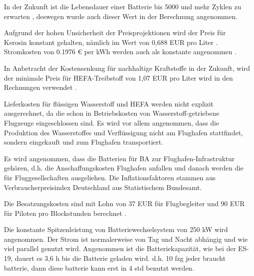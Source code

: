 In der Zukunft ist die Lebensdauer einer Batterie bis 5000 und mehr Zyklen zu erwarten \cite{reimers2018introduction}, deswegen wurde auch dieser
Wert in der Berechnung angenommen.

Aufgrund der hohen Unsicherheit der Preisprojektionen wird der Preis für Kerosin konstant gehalten, nämlich im Wert von
0,688 EUR pro Liter \cite{iata_industry_statistics_2024}. Stromkosten von 0.1976 € per kWh werden auch als konstante angenommen \cite{eurostat_nrg_pc_205}.


In Anbetracht der Kostensenkung für nachhaltige Kraftstoffe in der Zukunft, wird der minimale Preis für HEFA-Treibstoff 
von 1,07 EUR pro Liter wird in den Rechnungen verwendet \cite{watson2024sustainable}.

Lieferkosten für flüssigen Wasserstoff und HEFA werden nicht explizit ausgerechnet,
da die schon in Betriebskosten von Wasserstoff-getriebene Flugzeuge eingeschlossen sind. Es wird vor allem angenommen, dass die Produktion 
des Wasserstoffes und Verflüssigung nicht am Flughafen stattfindet, sondern eingekauft und zum Flughafen transportiert.

Es wird angenommen, dass die Batterien für BA zur Flughafen-Infrastruktur gehören, 
d.h. die Anschaffungskosten Flughafen anfallen und danach werden die für Fluggesellschaften ausgeliehen.
Die Inflationsfaktoren stammen aus Verbraucherpreisindex Deutschland aus Statistischem Bundesamt.

Die Besatzungskosten sind mit Lohn von 37 EUR für Flugbegleiter und 90 EUR für Piloten pro Blockstunden berechnet \cite{discover_airlines_cabin}.

Die konstante Spitzenleistung von Batteriewechselsystem von 250 kW wird angenommen. Der Strom ist normalerweise von Tag und Nacht abhängig
und wie viel parallel genutzt wird. Angenommen ist die Batteriekapazität, wie bei der ES-19, dauert es 3,6 h bis die Batterie geladen wird.
d.h. 10 fzg jeder braucht batterie, dann diese batterie kann erst in 4 std benutzt werden.